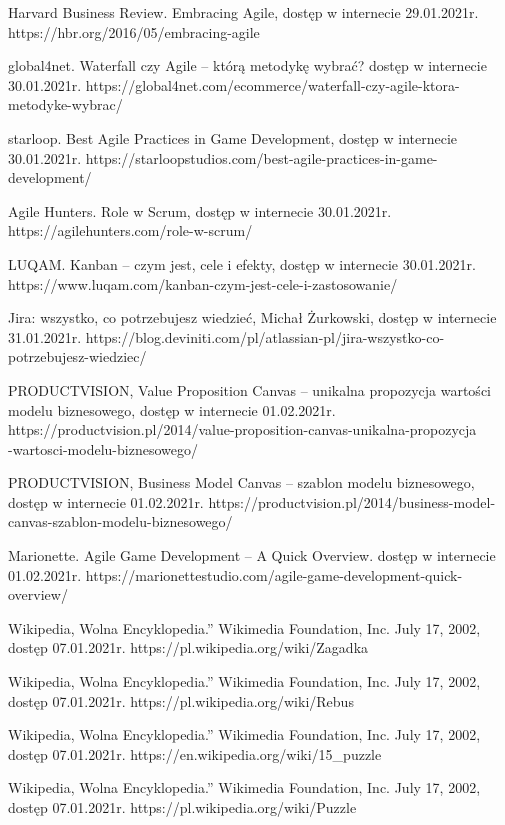 \documentclass[oneside,polski,logo]{amuthesis}
\begin{document}
\begin{thebibliography}{7}
Harvard Business Review. Embracing Agile, dostęp w internecie 29.01.2021r.
https://hbr.org/2016/05/embracing-agile

global4net. Waterfall czy Agile – którą metodykę wybrać? dostęp w internecie 30.01.2021r.
https://global4net.com/ecommerce/waterfall-czy-agile-ktora-metodyke-wybrac/

starloop. Best Agile Practices in Game Development, dostęp w internecie 30.01.2021r.
https://starloopstudios.com/best-agile-practices-in-game-development/

Agile Hunters. Role w Scrum, dostęp w internecie 30.01.2021r.
https://agilehunters.com/role-w-scrum/

LUQAM. Kanban – czym jest, cele i efekty, dostęp w internecie 30.01.2021r.
https://www.luqam.com/kanban-czym-jest-cele-i-zastosowanie/

Jira: wszystko, co potrzebujesz wiedzieć, Michał Żurkowski, dostęp w internecie 31.01.2021r.
https://blog.deviniti.com/pl/atlassian-pl/jira-wszystko-co-potrzebujesz-wiedziec/

PRODUCTVISION, Value Proposition Canvas – unikalna propozycja wartości modelu biznesowego, dostęp w internecie 01.02.2021r.
https://productvision.pl/2014/value-proposition-canvas-unikalna-propozycja\\-wartosci-modelu-biznesowego/

PRODUCTVISION, Business Model Canvas – szablon modelu biznesowego, dostęp w internecie 01.02.2021r.
https://productvision.pl/2014/business-model-canvas-szablon-modelu-biznesowego/

Marionette. Agile Game Development – A Quick Overview. dostęp w internecie 01.02.2021r.
https://marionettestudio.com/agile-game-development-quick-overview/

Wikipedia, Wolna Encyklopedia.” Wikimedia Foundation, Inc. July 17, 2002, dostęp 07.01.2021r.
https://pl.wikipedia.org/wiki/Zagadka

Wikipedia, Wolna Encyklopedia.” Wikimedia Foundation, Inc. July 17, 2002, dostęp 07.01.2021r.
https://pl.wikipedia.org/wiki/Rebus

Wikipedia, Wolna Encyklopedia.” Wikimedia Foundation, Inc. July 17, 2002, dostęp 07.01.2021r.
https://en.wikipedia.org/wiki/15\_puzzle

Wikipedia, Wolna Encyklopedia.” Wikimedia Foundation, Inc. July 17, 2002, dostęp 07.01.2021r.
https://pl.wikipedia.org/wiki/Puzzle


\end{thebibliography}
\end{document}
